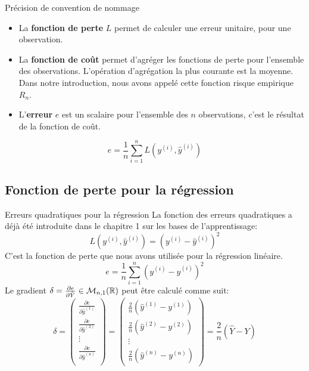 \begin{frame}{Précision de convention de nommage}
	\begin{itemize}
		\item La \textbf{fonction de perte} $L$ permet de calculer une erreur unitaire, pour une observation.
		\item La \textbf{fonction de coût} permet d'agréger les fonctions de perte pour l'ensemble des observations. L'opération d'agrégation la plus courante est la moyenne. Dans notre introduction, nous avons appelé cette fonction risque empirique $R_n$.
		\item L'\textbf{erreur} $e$ est un scalaire pour l'ensemble des $n$ observations, c'est le résultat de la fonction de coût.
	\end{itemize}
	\vspace{0.5cm}
	\begin{equation*}
		e = \frac{1}{n} \sum_{i=1}^{n} L\left(y^{(i)}, \hat{y}^{(i)}\right)
	\end{equation*}
\end{frame}

\subsection[Fonction de perte pour la régression]{Fonction de perte pour la régression}

\begin{frame}{Erreurs quadratiques pour la régression}
	La fonction des erreurs quadratiques a déjà été introduite dans le chapitre 1 sur les bases de l'apprentissage:
	\begin{equation*}
		L\left(y^{(i)}, \hat{y}^{(i)}\right) = \left(y^{(i)} - \hat{y}^{(i)}\right)^2
	\end{equation*}
	C'est la fonction de perte que nous avons utilisée pour la régression linéaire.
	\pause
	\begin{equation*}
		e = \frac{1}{n} \sum_{i=1}^n \left(y^{(i)} - \hat{y}^{(i)}\right)^2
	\end{equation*}
	\pause
	Le gradient $\delta = \frac{\partial{e}}{\partial{\hat{Y}}} \in \mathcal{M}_{n,1}(\mathbb{R})$ peut être calculé comme suit:
	\begin{equation*}
		\delta = 
		\begin{pmatrix}
			\frac{\partial{e}}{\partial{\hat{y}^{(1)}}} \\[5pt]
			\frac{\partial{e}}{\partial{\hat{y}^{(2)}}} \\[5pt]
			\vdots \\
			\frac{\partial{e}}{\partial{\hat{y}^{(n)}}} \\
		\end{pmatrix}
		=
		\begin{pmatrix}
			\frac{2}{n} \left(\hat{y}^{(1)} - y^{(1)}\right) \\
			\frac{2}{n} \left(\hat{y}^{(2)} - y^{(2)}\right) \\
			\vdots \\
			\frac{2}{n} \left(\hat{y}^{(n)} - y^{(n)}\right)
		\end{pmatrix}
		= \frac{2}{n} \left(\hat{Y} - Y\right)
	\end{equation*}
\end{frame}

